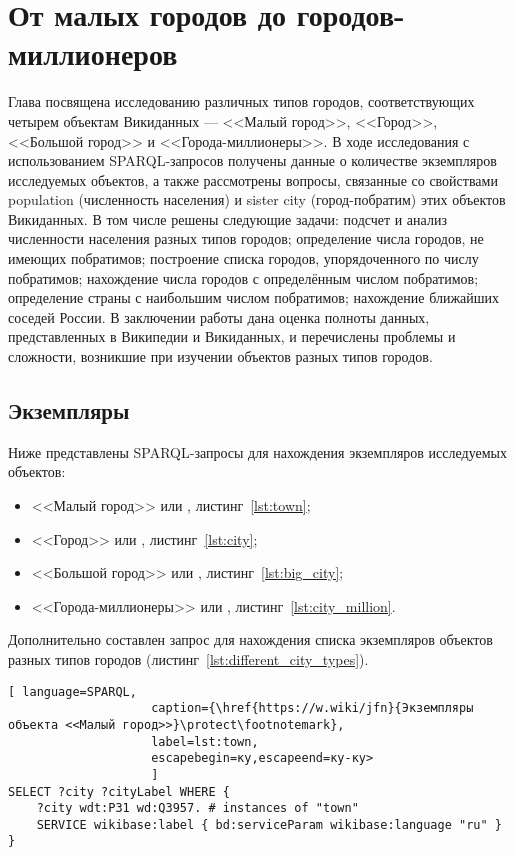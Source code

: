 \chapter{От малых городов до городов-миллионеров}
\label{ch:city}

Глава посвящена исследованию различных типов городов, соответствующих четырем объектам Викиданных — <<Малый город>>, <<Город>>, <<Большой город>> и <<Города-миллионеры>>. В ходе исследования с использованием SPARQL-запросов получены данные о количестве экземпляров исследуемых объектов, а также рассмотрены вопросы, связанные со свойствами population (численность населения) и sister city (город-побратим) этих объектов Викиданных. В том числе решены следующие задачи: подсчет и анализ численности населения разных типов городов; определение числа городов, не имеющих побратимов; построение списка городов, упорядоченного по числу побратимов; нахождение числа городов с определённым числом побратимов; определение страны с наибольшим числом побратимов; нахождение ближайших соседей России. В заключении работы дана оценка полноты данных, представленных в Википедии и Викиданных, и перечислены проблемы и сложности, возникшие при изучении объектов разных типов городов.
\section{Экземпляры}

Ниже представлены SPARQL-запросы для нахождения экземпляров исследуемых объектов: 
\begin{itemize}
	\item <<Малый город>> или , листинг~\ref{lst:town};
	\item <<Город>> или , листинг~\ref{lst:city};
	\item <<Большой город>> или , листинг~\ref{lst:big_city};
	\item <<Города-миллионеры>> или , листинг~\ref{lst:city_million}.
\end{itemize}

Дополнительно составлен запрос для нахождения списка экземпляров объектов разных типов городов (листинг~\ref{lst:different_city_types}).

\begin{lstlisting}[ language=SPARQL, 
                    caption={\href{https://w.wiki/jfn}{Экземпляры объекта <<Малый город>>}\protect\footnotemark},
                    label=lst:town, 
                    escapebegin=ку,escapeend=ку-ку>
                    ]
SELECT ?city ?cityLabel WHERE {
	?city wdt:P31 wd:Q3957. # instances of "town"
	SERVICE wikibase:label { bd:serviceParam wikibase:language "ru" }
}
\end{lstlisting}

